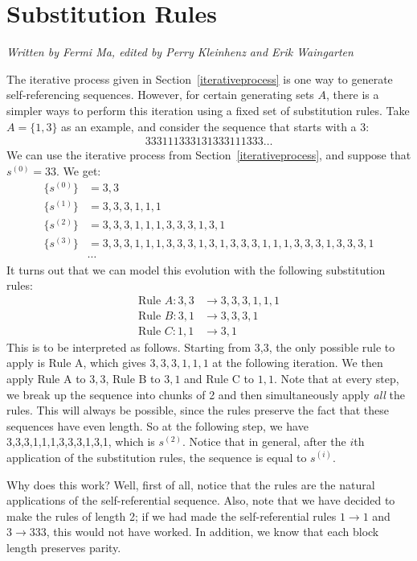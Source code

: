 \documentclass[runningheads,a4paper]{llncs}
\begin{document}
\section{Substitution Rules}
\label{substitutionrules}

\emph{Written by Fermi Ma, edited by Perry Kleinhenz and Erik Waingarten}

The iterative process given in Section~\ref{iterativeprocess} is one way to generate self-referencing sequences. However, for certain generating sets $A$, there is a simpler ways to perform this iteration using a fixed set of substitution rules. Take $A = \{1,3\}$ as an example, and consider the sequence that starts with a 3:
\begin{align*}
333111333131333111333\dots
\end{align*}
We can use the iterative process from Section~\ref{iterativeprocess}, and suppose that $s^{(0)} = 33$. We get:
\begin{align*}
\{s^{(0)}\} &= 3,3\\
\{s^{(1)}\} &= 3,3,3,1,1,1\\
\{s^{(2)}\} &= 3,3,3,1,1,1,3,3,3,1,3,1\\
\{s^{(3)}\} &= 3,3,3,1,1,1,3,3,3,1,3,1,3,3,3,1,1,1,3,3,3,1,3,3,3,1\\
&\cdots
\end{align*}
It turns out that we can model this evolution with the following substitution rules:
\begin{align*}
\text{Rule }A: 3,3 &\to 3,3,3,1,1,1 \\
\text{Rule }B: 3,1 &\to 3,3,3,1\\
\text{Rule }C: 1,1 &\to 3,1
\end{align*}
This is to be interpreted as follows. Starting from 3,3, the only possible rule to apply is Rule A, which gives $3,3,3,1,1,1$ at the following iteration. We then apply Rule A to $3,3$, Rule B to $3,1$ and Rule C to $1,1$. Note that at every step, we break up the sequence into chunks of 2 and then simultaneously apply \emph{all} the rules. This will always be possible, since the rules preserve the fact that these sequences have even length. So at the following step, we have 3,3,3,1,1,1,3,3,3,1,3,1, which is $s^{(2)}$. Notice that in general, after the $i$th application of the substitution rules, the sequence is equal to $s^{(i)}$.

Why does this work? Well, first of all, notice that the rules are the natural applications of the self-referential sequence. Also, note that we have decided to make the rules of length 2; if we had made the self-referential rules $1 \rightarrow 1$ and $3 \rightarrow 333$, this would not have worked. In addition, we know that each block length preserves parity. 
\end{document}

